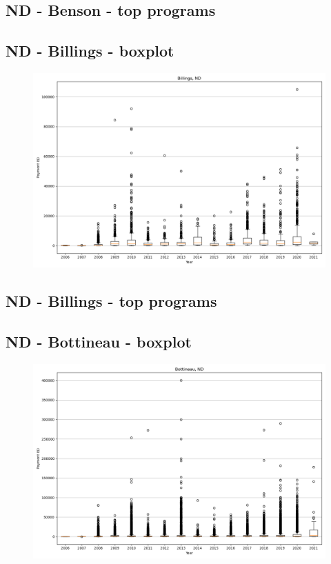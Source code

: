 \subsection*{ND - Benson - top programs}

\newpage
\subsection*{ND - Billings - boxplot}
\begin{figure}[h]
\centering
\includegraphics[width=7in]{../output/boxplots/counties/Billings-ND_boxplot.png}
\end{figure}


\subsection*{ND - Billings - top programs}

\newpage
\subsection*{ND - Bottineau - boxplot}
\begin{figure}[h]
\centering
\includegraphics[width=7in]{../output/boxplots/counties/Bottineau-ND_boxplot.png}
\end{figure}



